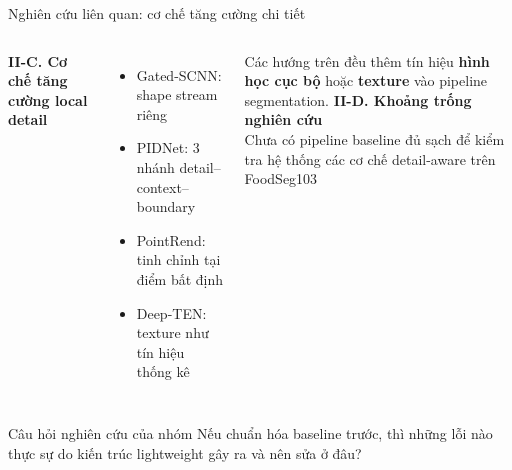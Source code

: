 \begin{frame}{Nghiên cứu liên quan: cơ chế tăng cường chi tiết}
  \begin{columns}
      \textbf{II-C. Cơ chế tăng cường local detail}
      \begin{itemize}
        \item Gated-SCNN: shape stream riêng \cite{takikawa2019gatedscnn}
        \item PIDNet: 3 nhánh detail--context--boundary \cite{xu2023pidnet}
        \item PointRend: tinh chỉnh tại điểm bất định \cite{kirillov2020pointrend}
        \item Deep-TEN: texture như tín hiệu thống kê \cite{zhang2017deepten}
      \end{itemize}

        Các hướng trên đều thêm tín hiệu \textbf{hình học cục bộ} hoặc \textbf{texture} vào pipeline segmentation.
    \textbf{II-D. Khoảng trống nghiên cứu}\\
        Chưa có pipeline baseline đủ sạch để kiểm tra hệ thống các cơ chế detail-aware trên FoodSeg103
  \end{columns}
        \begin{block}{Câu hỏi nghiên cứu của nhóm}
        Nếu chuẩn hóa baseline trước, thì những lỗi nào thực sự do kiến trúc lightweight gây ra và nên sửa ở đâu?
      \end{block}
\end{frame}
